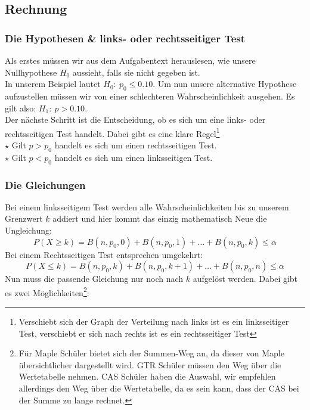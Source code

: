 \subsection{Rechnung}
	\subsubsection{Die Hypothesen \& links- oder rechtsseitiger Test}
		Als erstes müssen wir aus dem Aufgabentext herauslesen, wie unsere
		Nullhypothese \(H_0\) aussieht, falls sie nicht gegeben ist.\\
		In unserem Beispiel lautet \(H_0:\ p_0\leq 0.10\). Um nun unsere alternative
		Hypothese aufzustellen müssen wir von einer schlechteren Wahrscheinlichkeit
		ausgehen. Es gilt also: \(H_1:\ p>0.10\).\\
		Der nächste Schritt ist die Entscheidung, ob es sich um eine links- oder
		rechtsseitigen Test handelt. Dabei gibt es eine klare
		Regel\footnote{Verschiebt sich der Graph der Verteilung nach links ist es ein
		linksseitiger Test, verschiebt er sich nach rechts ist es ein rechtsseitiger
		Test}\\
		\(\star\) Gilt \(p>p_0\) handelt es sich um einen rechtsseitigen Test.\\
		\(\star\) Gilt \(p<p_0\) handelt es sich um einen linksseitigen Test.\\
	
	\subsubsection{Die Gleichungen}
		Bei einem linksseitigem Test werden alle Wahrscheinlichkeiten bis zu unserem
		Grenzwert \(k\) addiert und hier kommt das einzig mathematisch Neue die
		Ungleichung:
		\[P(X\geq k)=B(n,p_0,0)+B(n,p_0,1)+\ldots+B(n,p_0,k) \leq \alpha\]
		Bei einem Rechtsseitigen Test entsprechen umgekehrt:
		\[P(X\leq k)=B(n,p_0,k)+B(n,p_0,k+1)+\ldots+B(n,p_0,n) \leq \alpha\]
		Nun muss die passende Gleichung nur noch nach \(k\) aufgelöst werden. Dabei
		gibt es zwei Möglichkeiten\footnote{Für Maple Schüler bietet sich der Summen-Weg
		an, da dieser von Maple übersichtlicher dargestellt wird. GTR Schüler müssen
		den Weg über die Wertetabelle nehmen. CAS Schüler haben die Auswahl, wir
		empfehlen allerdings den Weg über die Wertetabelle, da es sein kann, dass der
		CAS bei der Summe zu lange rechnet.}:\\

